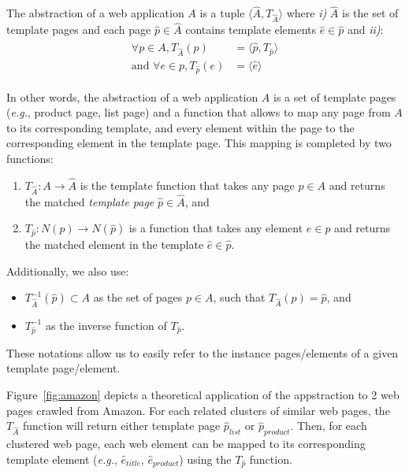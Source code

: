 \begin{defn}
The abstraction of a web application $A$ is a tuple $\langle\hat{A}, T_{\hat{A}}\rangle$ where \emph{i)} $\hat{A}$ is the set of template pages and each page $\hat{p} \in \hat{A}$ contains template elements $\hat{e} \in \hat{p}$ and \emph{ii)}:
\begin{align}
  \label{eq:1}
  \begin{split}
    \forall p \in A, T_{\hat{A}}(p) & = \langle\hat{p}, T_{\hat{p}}\rangle \\
    \text{and } \forall e \in p, T_{\hat{p}}(e) & = \langle\hat{e}\rangle
  \end{split}
\end{align}\end{defn}

In other words, the abstraction of a web application $A$ is a set of template pages (\emph{e.g.}, product page, list page) and a function that allows to map any page from $A$ to its corresponding template, and every element within the page to the corresponding element in the template page.
This mapping is completed by two functions:
\begin{enumerate}
\item $T_{\hat{A}}: A \to \hat{A}$ is the template function that takes any page $p \in A$ and returns the matched \emph{template page} $\hat{p} \in \hat{A}$, and
\item $T_{\hat{p}}: N(p) \to N(\hat{p})$ is a function that takes any element $e \in p$ and returns the matched element in the template $\hat{e} \in \hat{p}$.
\end{enumerate}

Additionally, we also use:
\begin{itemize}
  \item $T^{-1}_{\hat{A}}(\hat{p}) \subset A$ as the set of pages $p \in A$, such that $T_{\hat{A}}(p) = \hat{p}$, and 
  \item $T^{-1}_{\hat{p}}$ as the inverse function of $T_{\hat{p}}$.
\end{itemize}
These notations allow us to easily refer to the instance pages/elements of a given template page/element.

Figure~\ref{fig:amazon} depicts a theoretical application of the appstraction to 2 web pages crawled from Amazon.
For each related clusters of similar web pages, the $T_{\hat{A}}$ function will return either template page $\hat{p}_{list}$ or $\hat{p}_{product}$.
Then, for each clustered web page, each web element can be mapped to its corresponding template element (\emph{e.g.}, $\hat{e}_{title}$, $\hat{e}_{product}$) using the $T_{\hat{p}}$ function.

